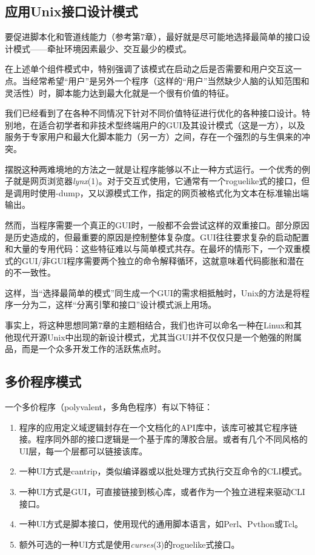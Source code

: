 \documentclass[12pt,oneside]{book}
\begin{document}
\begin{common-format}
\section{应用Unix接口设计模式}
要促进脚本化和管道线能力（参考第7章），最好就是尽可能地选择最简单的接口设计模式——牵扯环境因素最少、交互最少的模式。

在上述单个组件模式中，特别强调了该模式在启动之后是否需要和用户交互这一点。当经常希望“用户”是另外一个程序（这样的“用户”当然缺少人脑的认知范围和灵活性）时，脚本能力达到最大化就是一个很有价值的特征。

我们已经看到了在各种不同情况下针对不同价值特征进行优化的各种接口设计。特别地，在适合初学者和非技术型终端用户的GUI及其设计模式（这是一方），以及服务于专家用户和最大化脚本能力（另一方）之间，存在一个强烈的与生俱来的冲突。

摆脱这种两难境地的方法之一就是让程序能够以不止一种方式运行。一个优秀的例子就是网页浏览器\textit{lynx}(1)。对于交互式使用，它通常有一个roguelike式的接口，但是调用时使用-dump，又以源模式工作，指定的网页被格式化为文本在标准输出端输出。

然而，当程序需要一个真正的GUI时，一般都不会尝试这样的双重接口。部分原因是历史造成的，但最重要的原因是控制整体复杂度。GUI往往要求复杂的启动配置和大量的专用代码：这些特征难以与简单模式共存。在最坏的情形下，一个双重模式的GUI/非GUI程序需要两个独立的命令解释循环，这就意味着代码膨胀和潜在的不一致性。

这样，当“选择最简单的模式”同生成一个GUI的需求相抵触时，Unix的方法是将程序一分为二，这样“分离引擎和接口”设计模式派上用场。

事实上，将这种思想同第7章的主题相结合，我们也许可以命名一种在Linux和其他现代开源Unix中出现的新设计模式，尤其当GUI并不仅仅只是一个勉强的附属品，而是一个众多开发工作的活跃焦点时。

\subsection{多价程序模式}
一个多价程序（polyvalent，多角色程序）有以下特征：
\begin{enumerate}
\item 程序的应用定义域逻辑封存在一个文档化的API库中，该库可被其它程序链接。程序同外部的接口逻辑是一个基于库的薄胶合层。或者有几个不同风格的UI层，每一个层都可以链接该库。
\item 一种UI方式是cantrip，类似编译器或以批处理方式执行交互命令的CLI模式。
\item 一种UI方式是GUI，可直接链接到核心库，或者作为一个独立进程来驱动CLI接口。
\item 一种UI方式是脚本接口，使用现代的通用脚本语言，如Perl、Pvthon或Tcl。
\item 额外可选的一种UI方式是使用\textit{curses}(3)的roguelike式接口。
\end{enumerate}


\end{common-format}
\end{document}
